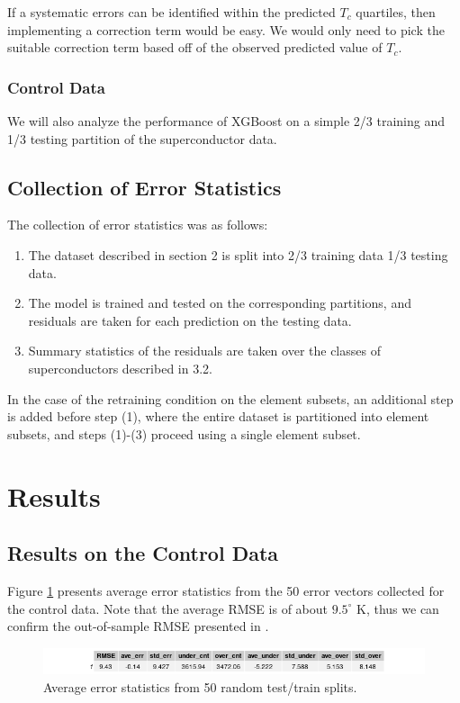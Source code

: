 \documentclass[oneside,12pt]{amsart}
\begin{document}
 If a systematic errors can be identified within the predicted $T_c$ quartiles, then implementing a correction term would be easy. We would only need to pick the suitable correction term based off of the observed predicted value of $T_c$.
 
 \subsubsection{Control Data} We will also analyze the performance of XGBoost on a simple 2/3 training and 1/3 testing partition of the superconductor data. 
 
 \subsection{Collection of Error Statistics}
The collection of error statistics was as follows:
\begin{enumerate}
	\item The dataset described in section 2 is split into 2/3 training data 1/3 testing data.
	\item The model is trained and tested on the corresponding partitions, and residuals are taken for each prediction on the testing data.
	\item Summary statistics of the residuals are taken over the classes of superconductors described in 3.2.
\end{enumerate}
In the case of the retraining condition on the element subsets, an additional step is added before step (1), where the entire dataset is partitioned into element subsets, and steps (1)-(3) proceed using a single element subset.

\section{Results}

\subsection{Results on the Control Data}

 Figure \ref{fig:control_table} presents average error statistics from the 50 error vectors collected for the control data. Note that the average RMSE is of about $9.5^\circ$ K, thus we can confirm the out-of-sample RMSE presented in \cite{hamidieh_data-driven_2018}.
 
 \begin{figure}[ht]
     \centering
     \includegraphics[width = \linewidth]{../Plots/control_tbl.png}
     \caption{Average error statistics from 50 random test/train splits.}
     \label{fig:control_table}
 \end{figure}
\end{document}
